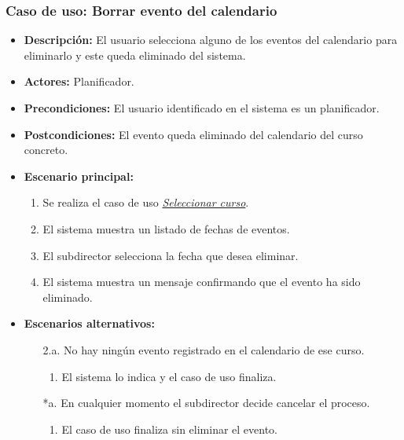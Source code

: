 \subsubsection*{Caso de uso: Borrar evento del calendario}
\begin{itemize}
\item{\bf Descripción:} El usuario selecciona alguno de los eventos del calendario para eliminarlo y este queda eliminado del sistema.
\item{\bf Actores:} Planificador.
\item{\bf Precondiciones:} El usuario identificado en el sistema es un planificador.
\item{\bf Postcondiciones:} El evento queda eliminado del calendario del curso concreto.
\item{\bf Escenario principal:}
	\begin{enumerate}
	\item Se realiza el caso de uso {\em \hyperref[select_curso]{Seleccionar curso}}.
	\item El sistema muestra un listado de fechas de eventos.
	\item El subdirector selecciona la fecha que desea eliminar.
	\item El sistema muestra un mensaje confirmando que el evento ha sido eliminado.
	\end{enumerate}
\item{\bf Escenarios alternativos:}
	\begin{itemize}
		\item[2.a.] No hay ningún evento registrado en el calendario de ese curso.
		\begin{enumerate}
			\item El sistema lo indica y el caso de uso finaliza.
		\end{enumerate}
		\item[*a.] En cualquier momento el subdirector decide cancelar el proceso.
		\begin{enumerate}
		\item El caso de uso finaliza sin eliminar el evento.
		\end{enumerate}
	\end{itemize}
\end{itemize}



